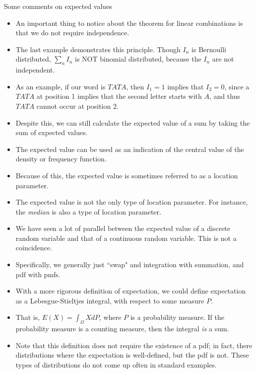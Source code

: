 \begin{frame}[allowframebreaks]{Some comments on expected values}

\begin{itemize}
  \item An important thing to notice about the theorem for linear combinations is that we do not require independence.
  \item The last example demonstrates this principle. Though $I_n$ is Bernoulli distributed, $\sum_n I_n$ is \alert{NOT} binomial distributed, because the $I_n$ are not independent.
  \item As an example, if our word is $TATA$, then $I_1 = 1$ implies that $I_2 = 0$, since a $TATA$ at position 1 implies that the second letter starts with $A$, and thus $TATA$ cannot occur at position $2$.
  \item Despite this, we can still calculate the expected value of a sum by taking the sum of expected values.

\framebreak

    \item The expected value can be used as an indication of the central value of the density or frequency function.
    \item Because of this, the expected value is sometimes referred to as a \alert{location parameter}.
    \item The expected value is not the only type of location parameter. For instance, the \emph{median} is also a type of location parameter.
    \item We have seen a lot of parallel between the expected value of a discrete random variable and that of a continuous random variable. This is not a coincidence. 
    \item Specifically, we generally just ``swap" and integration with summation, and pdf with pmfs.
    \item With a more rigorous definition of expectation, we could define expectation as a \alert{Lebesgue-Stieltjes} integral, with respect to some measure $P$.
    \item That is, $E(X) = \int_\Omega XdP$, where $P$ is a probability measure. If the probability measure is a counting measure, then the integral \emph{is} a sum. 
    \item Note that this definition does not require the existence of a pdf; in fact, there distributions where the expectation is well-defined, but the pdf is not. These types of distributions do not come up often in standard examples. 
  \end{itemize}
\end{frame}

